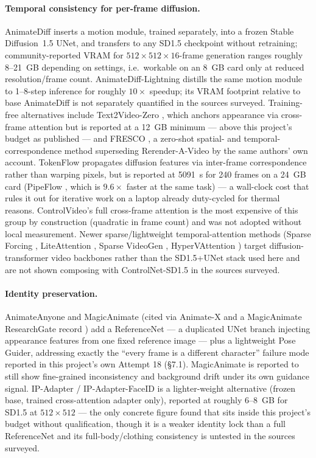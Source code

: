 \documentclass[11pt]{article}
\newcommand{\secsym}{\S}
\begin{document}
\paragraph{Temporal consistency for per-frame diffusion.} AnimateDiff
\cite{guo2023animatediff} inserts a motion module, trained separately,
into a frozen Stable Diffusion~1.5 UNet, and transfers to any SD1.5
checkpoint without retraining; community-reported VRAM for
$512\times512\times16$-frame generation ranges roughly 8--21~GB depending
on settings, i.e.\ workable on an 8~GB card only at reduced
resolution/frame count. AnimateDiff-Lightning
\cite{lin2024animatedifflightning} distills the same motion module to
1--8-step inference for roughly $10\times$ speedup; its VRAM footprint
relative to base AnimateDiff is not separately quantified in the sources
surveyed. Training-free alternatives include Text2Video-Zero
\cite{khachatryan2023text2videozero}, which anchors appearance via
cross-frame attention but is reported at a 12~GB minimum --- above this
project's budget as published --- and FRESCO \cite{yang2024fresco}, a
zero-shot spatial- and temporal-correspondence method superseding
Rerender-A-Video \cite{yang2023rerender} by the same authors' own account.
TokenFlow \cite{geyer2023tokenflow} propagates diffusion features via
inter-frame correspondence rather than warping pixels, but is reported at
5091~s for 240 frames on a 24~GB card (PipeFlow \cite{pipeflow2025}, which
is $9.6\times$ faster at the same task) --- a wall-clock cost that rules
it out for iterative work on a laptop already duty-cycled for thermal
reasons. ControlVideo's full cross-frame attention is the most expensive
of this group by construction (quadratic in frame count) and was not
adopted without local measurement. Newer sparse/lightweight
temporal-attention methods (Sparse Forcing \cite{sparseforcing2026},
LiteAttention \cite{liteattention2025}, Sparse VideoGen
\cite{sparsevideogen2025}, HyperVAttention \cite{hypervattention2026})
target diffusion-transformer video backbones rather than the SD1.5+UNet
stack used here and are not shown composing with ControlNet-SD1.5 in the
sources surveyed.

\paragraph{Identity preservation.} AnimateAnyone and MagicAnimate (cited
via Animate-X \cite{animatex2024} and a MagicAnimate ResearchGate record
\cite{magicanimate2023}) add a ReferenceNet --- a duplicated UNet branch
injecting appearance features from one fixed reference image --- plus a
lightweight Pose Guider, addressing exactly the ``every frame is a
different character'' failure mode reported in this project's own Attempt
18 (\secsym7.1). MagicAnimate is reported to still show fine-grained
inconsistency and background drift under its own guidance signal.
IP-Adapter / IP-Adapter-FaceID is a lighter-weight alternative (frozen
base, trained cross-attention adapter only), reported at roughly 6--8~GB
for SD1.5 at $512\times512$ --- the only concrete figure found that sits
inside this project's budget without qualification, though it is a weaker
identity lock than a full ReferenceNet and its full-body/clothing
consistency is untested in the sources surveyed.
\end{document}
